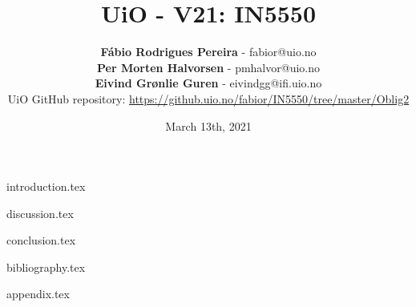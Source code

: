 \documentclass{article}
\title{UiO - V21: IN5550}
\author{\textbf{Fábio Rodrigues Pereira} - fabior@uio.no \\
\textbf{Per Morten Halvorsen} - pmhalvor@uio.no\\
\textbf{Eivind Grønlie Guren} - eivindgg@ifi.uio.no\\
\small UiO GitHub repository: \href{https://github.uio.no/fabior/IN5550/tree/master/Oblig2}{ https://github.uio.no/fabior/IN5550/tree/master/Oblig2}}
\date{March 13th, 2021}
\begin{document}
\maketitle

\tableofcontents

\bigskip \bigskip

{introduction.tex}

{discussion.tex}

{conclusion.tex}

{bibliography.tex}

{appendix.tex}
\end{document}
